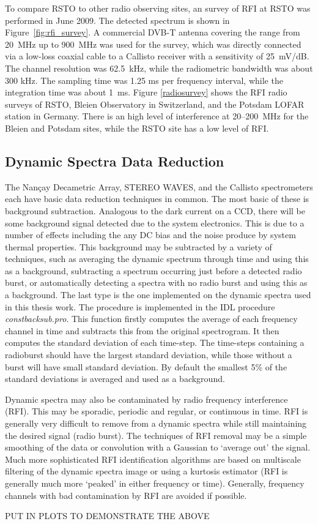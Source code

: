 To compare RSTO to other radio observing sites, an survey of RFI at RSTO was performed in June 2009. The detected spectrum is shown in Figure~\ref{fig:rfi_survey}.  A commercial DVB-T antenna covering the range from 20~MHz up to 900~MHz was used for the survey, which was directly connected via a low-loss coaxial cable to a Callisto receiver with a sensitivity of 25~mV/dB. The channel resolution was 62.5~kHz, while the radiometric bandwidth was about 300 kHz. The sampling time was 1.25 ms per frequency interval, while the integration time was about 1~ms.  Figure \ref{radiosurvey} shows the RFI radio surveys of RSTO, Bleien Observatory in Switzerland, and the Potsdam LOFAR station in Germany. There is an high level of interference at 20--200~MHz for the Bleien and Potsdam sites, while the RSTO site has a low level of RFI.

\subsection{Dynamic Spectra Data Reduction}

The Nan\c{c}ay Decametric Array, STEREO WAVES, and the Callisto spectrometers each have basic data reduction techniques in common. The most basic of these is background subtraction. Analogous to the dark current on a CCD, there will be some background signal detected due to the system electronics. This is due to a number of effects including the any DC bias and the noise produce by system thermal properties. This background may be subtracted by a variety of techniques, such as averaging the dynamic spectrum through time and using this as a background, subtracting a spectrum occurring just before a detected radio burst, or automatically detecting a spectra with no radio burst and using this as a background. The last type is the one implemented on the dynamic spectra used in this thesis work. The procedure is implemented in the IDL procedure {\it constbacksub.pro}. This function firstly computes the average of each frequency channel in time and subtracts this from the original spectrogram. It then computes the standard deviation of each time-step. The time-steps containing a radioburst should have the largest standard deviation, while those without a burst will have small standard deviation. By default the smallest  5\% of the standard deviations is averaged and used as a background.

Dynamic spectra may also be contaminated by radio frequency interference (RFI). This may be sporadic, periodic and regular, or continuous in time. RFI is generally very difficult to remove from a dynamic spectra while still maintaining the desired signal (radio burst). The techniques of RFI removal may be a simple smoothing of the data  or convolution with a Gaussian to `average out' the signal. Much more sophisticated RFI identification algorithms are based on multiscale filtering of the dynamic spectra image or using a kurtosis estimator (RFI is generally much more `peaked' in either frequency or time). Generally, frequency channels with bad contamination by RFI are avoided if possible.

PUT IN PLOTS TO DEMONSTRATE THE ABOVE

